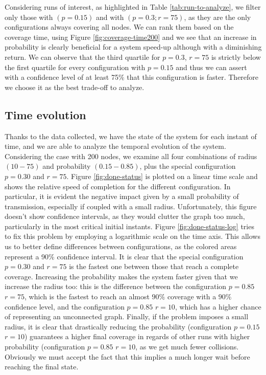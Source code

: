 Considering runs of interest, as highlighted in Table \ref{tab:run-to-analyze}, we filter only those with $(p=0.15)$ and with $(p=0.3;r=75)$, as they are the only configurations always covering all nodes.
We can rank them based on the coverage time, using Figure \ref{fig:coverage-time200} and we see that an increase in probability is clearly beneficial for a system speed-up although with a diminishing return. We can observe that the third quartile for $p=0.3$, $r=75$ is strictly below the first quartile for every configuration with $p=0.15$ and thus we can assert with a confidence level of at least 75\% that this configuration is faster. Therefore we choose it as the best trade-off to analyze.

\subsection{Time evolution}\label{time-evolution}
Thanks to the data collected, we have the state of the system for each instant of time, and we are able to analyze the temporal evolution of the system. Considering the case with 200 nodes, we examine all four combinations of radius $(10-75)$ and probability $(0.15-0.85)$, plus the special configuration $p=0.30$ and $r=75$. 
Figure \ref{fig:done-status} is plotted on a linear time scale and shows the relative speed of completion for the different configuration. In particular, it is evident the negative impact given by a small probability of transmission, especially if coupled with a small radius. 
Unfortunately, this figure doesn't show confidence intervals, as they would clutter the graph too much, particularly in the most critical initial instants. 
Figure \ref{fig:done-status-log} tries to fix this problem by employing a logarithmic scale on the time axis. This allows us to better define differences between configurations, as the colored areas represent a 90\% confidence interval. It is clear that the special configuration $p=0.30$ and $r=75$ is the fastest one between those that reach a complete coverage. 
Increasing the probability makes the system faster given that we increase the radius too: this is the difference between the configuration $p=0.85$ $r=75$, which is the fastest to reach an almost $90\%$ coverage with a $90\%$ confidence level, and the configuration $p=0.85$ $r=10$, which has a higher chance of representing an unconnected graph. 
Finally, if the problem imposes a small radius, it is clear that drastically reducing the probability (configuration $p=0.15$ $r=10$) guarantees a higher final coverage in regards of other runs with higher probability (configuration $p=0.85$ $r=10$, as we get much fewer collisions. Obviously we must accept the fact that this implies a much longer wait before reaching the final state.
